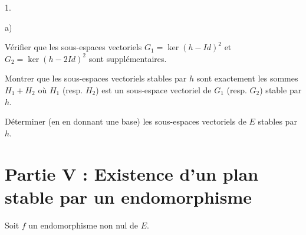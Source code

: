 \documentclass[11pt]{article}%
\begin{document}
\begin{noliste}{1.}
\begin{noliste}{a)}
 \setlength{\itemsep}{2mm}
\item Vérifier que les sous-espaces vectoriels $G_{1} = \ker
(h-Id)^{2}$ et $G_{2} = \ker (h-2Id)^{2}$ sont supplémentaires.

\item Montrer que les sous-espaces vectoriels stables par $h$ sont
exactement les sommes $H_{1} + H_{2}$ où $H_{1}$ (resp. $H_{2}$) est un
sous-espace vectoriel de $G_{1}$ (resp. $G_{2}$) stable par $h$.

\item Déterminer (en en donnant une base) les sous-espaces vectoriels
de $E$
stables par $h$.
\end{noliste}
\end{noliste}

\section*{Partie V : {Existence d'un plan stable par un endomorphisme}}

Soit $f$ un endomorphisme non nul de $E$.
\end{document}
